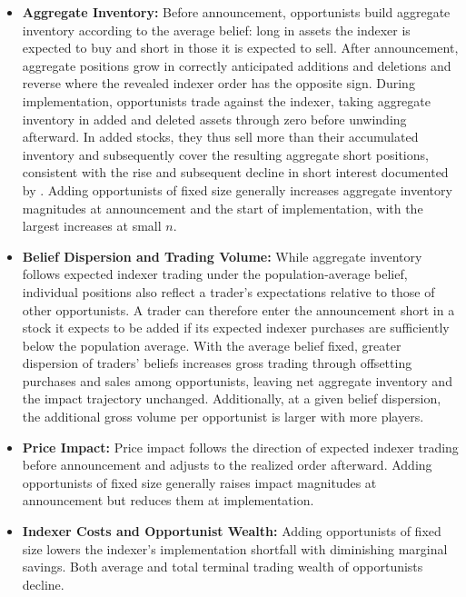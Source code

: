 \documentclass[12pt]{article}
\numberwithin{equation}{section}
\theoremstyle{definition}
\begin{document}
\begin{enumerate}
\begin{itemize}
\item \textbf{Aggregate Inventory:}
Before announcement, opportunists build aggregate inventory according to
the average belief: long in assets the indexer is expected to buy and short
in those it is expected to sell. After announcement, aggregate positions grow in
correctly anticipated additions and deletions and reverse where the
revealed indexer order has the opposite sign.
During implementation, opportunists trade against the indexer, taking
aggregate inventory in added and deleted assets through zero before
unwinding afterward. In added stocks, they thus sell more than their
accumulated inventory and subsequently cover the resulting aggregate short
positions, consistent with the rise and subsequent decline in short
interest documented by \citet{PegoraroSammonShim2026}.
Adding opportunists of fixed size generally increases aggregate inventory
magnitudes at announcement and the start of implementation, with the largest
increases at small \(n\).

\item \textbf{Belief Dispersion and Trading Volume:}
While aggregate inventory follows expected indexer trading under the
population-average belief, individual positions also reflect a trader's
expectations relative to those of other opportunists. A trader can therefore
enter the announcement short in a stock it expects to be added if its
expected indexer purchases are sufficiently below the population average.
With the average belief fixed,
greater dispersion of traders' beliefs increases gross trading through
offsetting purchases and sales among opportunists, leaving net aggregate
inventory and the impact trajectory unchanged. Additionally, at a given belief dispersion, the additional
gross volume per opportunist is larger with more players.

\item \textbf{Price Impact:}
Price impact follows the direction of expected indexer trading before
announcement and adjusts to the realized order afterward.
Adding opportunists of fixed size generally raises impact magnitudes at
announcement but reduces them at implementation.

\item \textbf{Indexer Costs and Opportunist Wealth:}
Adding opportunists of fixed size lowers the indexer's implementation
shortfall with diminishing marginal savings. Both average and total
terminal trading wealth of opportunists decline.


\end{itemize}
\end{enumerate}
\end{document}
